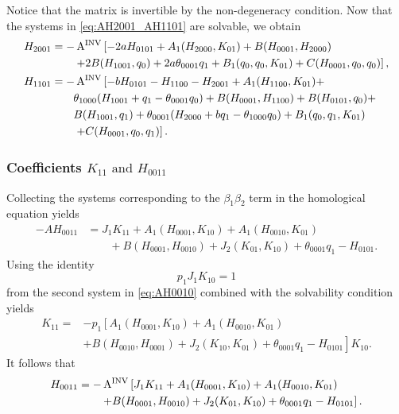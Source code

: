 Notice that the matrix is invertible by the non-degeneracy condition. Now that
the systems in \cref{eq:AH2001_AH1101} are solvable, we obtain
\begin{equation}
\label{eq:H2001_H1101}
\begin{aligned}
H_{2001} &= -\operatorname{A^{\text{INV}}} \left[ -2 a H_{0101} + A_1(H_{2000},K_{01}) +
	      B(H_{0001},H_{2000})  \right. \\
				& \qquad \left. + 2 B(H_{1001},q_0) + 2 a \theta_{0001} q_1 +
				B_1(q_0,q_0,K_{01}) + C(H_{0001},q_0,q_0) \right], \\
H_{1101} &= -\operatorname{A^{\text{INV}}} \left[ -b H_{0101} - H_{1100} - H_{2001} +
				A_1(H_{1100},K_{01}) + \right. \\
				& \qquad \theta_{1000} (H_{1001} + q_1 - \theta_{0001} q_0) + 
				B(H_{0001},H_{1100}) + B(H_{0101},q_0) + \\
				& \qquad B(H_{1001},q_1) + \theta_{0001} (H_{2000} + b q_1 -
								\theta_{1000} q_0) + B_1(q_0,q_1,K_{01}) \\
				& \qquad  \left. + C(H_{0001},q_0,q_1) \right].
\end{aligned}
\end{equation}

\subsubsection{Coefficients \texorpdfstring{$K_{11} \text{ and } H_{0011}$}{K11
				and H0011}}

Collecting the systems corresponding to the $\beta_1 \beta_2$ term in the
homological equation yields
\begin{equation}
\label{eq:AH0011}
\begin{aligned}
-A H_{0011} &= J_1 K_{11} + A_1(H_{0001},K_{10}) + A_1(H_{0010},K_{01}) \\
						& \qquad +
						B(H_{0001},H_{0010})+J_2(K_{01},K_{10})+\theta_{0001}q_1-H_{0101}.
\end{aligned}
\end{equation}
Using the identity 
%
\begin{equation*}
   p_1J_1K_{10}=1 
\end{equation*}
from the second system in \cref{eq:AH0010} combined with the solvability
condition yields
\begin{equation}
\begin{aligned}
K_{11}={}& -p_1\left[A_1(H_{0001},K_{10})+A_1(H_{0010},K_{01}) \right. \nonumber\\
				 &\left. + B(H_{0010},H_{0001}) +
				 J_2(K_{10},K_{01}) + \theta_{0001} q_1 - H_{0101} \right]K_{10}.
\end{aligned}
\end{equation}
It follows that 
\begin{equation}
\begin{aligned}
H_{0011} &= -\operatorname{A^{\text{INV}}} \left[ J_1 K_{11} + A_1(H_{0001},K_{10}) +
				A_1(H_{0010},K_{01}) \right. \\
				 & \qquad \left. +
                    B(H_{0001},H_{0010})+J_2(K_{01},K_{10})+\theta_{0001}q_1-H_{0101}
				 \right].
\end{aligned}
\end{equation}

